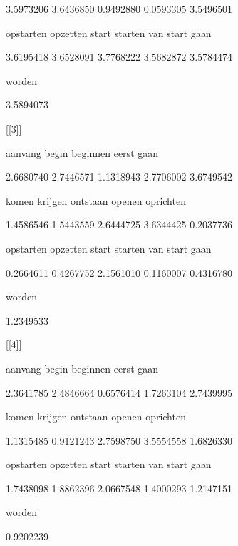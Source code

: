      3.5973206      3.6436850      0.9492880      0.0593305      3.5496501 



     opstarten       opzetten          start        starten van start gaan 



     3.6195418      3.6528091      3.7768222      3.5682872      3.5784474 



        worden 



     3.5894073 



[[3]]



       aanvang          begin       beginnen          eerst           gaan 



     2.6680740      2.7446571      1.1318943      2.7706002      3.6749542 



         komen        krijgen       ontstaan         openen      oprichten 



     1.4586546      1.5443559      2.6444725      3.6344425      0.2037736 



     opstarten       opzetten          start        starten van start gaan 



     0.2664611      0.4267752      2.1561010      0.1160007      0.4316780 



        worden 



     1.2349533 



[[4]]



       aanvang          begin       beginnen          eerst           gaan 



     2.3641785      2.4846664      0.6576414      1.7263104      2.7439995 



         komen        krijgen       ontstaan         openen      oprichten 



     1.1315485      0.9121243      2.7598750      3.5554558      1.6826330 



     opstarten       opzetten          start        starten van start gaan 



     1.7438098      1.8862396      2.0667548      1.4000293      1.2147151 



        worden 



     0.9202239 
